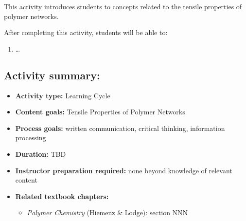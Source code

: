 %
%
%
%

\renewcommand{\figpath}{content/polymphys/mechanical-properties/elasticity/figs}
\renewcommand{\labelbase}{elasticity}

\begin{activity}

\begin{instructornotes}
	This activity introduces students to concepts related to the tensile properties of polymer networks.
	
	After completing this activity, students will be able to:
	\begin{enumerate}
		\item \dots
	\end{enumerate}
	
	\subsection*{Activity summary:}
	\begin{itemize}
		\item \textbf{Activity type:} Learning Cycle
		\item \textbf{Content goals:} Tensile Properties of Polymer Networks
		\item \textbf{Process goals:} %
			written communication, critical thinking, information processing
		\item \textbf{Duration:} TBD
		\item \textbf{Instructor preparation required:} none beyond knowledge of relevant content
		\item \textbf{Related textbook chapters:}
			\begin{itemize}
				\item \emph{Polymer Chemistry} (Hiemenz \& Lodge): section NNN
			\end{itemize}
	\end{itemize}
	

\end{instructornotes}
\end{activity}
